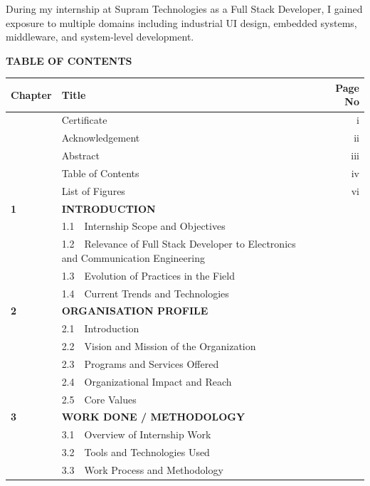 \documentclass[12pt,a4paper]{report}
\begin{document}
During my internship at Supram Technologies as a Full Stack Developer, I gained exposure to multiple domains including industrial UI design, embedded systems, middleware, and system-level development.


\newpage
\begin{center}
{\Large \textbf{TABLE OF CONTENTS}\par}
\end{center}

\vspace{0.3cm}
\begin{tabular}{@{} p{1.8cm} p{10.5cm} r @{}}
\textbf{Chapter} & \textbf{Title} & \textbf{Page No} \\
\midrule
 & Certificate & i \\
 & Acknowledgement & ii \\
 & Abstract & iii \\
 & Table of Contents & iv \\
 & List of Figures & vi \\
\addlinespace[4pt]
\textbf{1} & \textbf{INTRODUCTION} & \\
 & 1.1~~Internship Scope and Objectives & \\
 & 1.2~~Relevance of Full Stack Developer to Electronics and Communication Engineering & \\
 & 1.3~~Evolution of Practices in the Field & \\
 & 1.4~~Current Trends and Technologies & \\
\addlinespace[4pt]
\textbf{2} & \textbf{ORGANISATION PROFILE} & \\
 & 2.1~~Introduction & \\
 & 2.2~~Vision and Mission of the Organization & \\
 & 2.3~~Programs and Services Offered & \\
 & 2.4~~Organizational Impact and Reach & \\
 & 2.5~~Core Values & \\
\addlinespace[4pt]
\textbf{3} & \textbf{WORK DONE / METHODOLOGY} & \\
 & 3.1~~Overview of Internship Work & \\
 & 3.2~~Tools and Technologies Used & \\
 & 3.3~~Work Process and Methodology & \\

\end{tabular}
\end{document}
